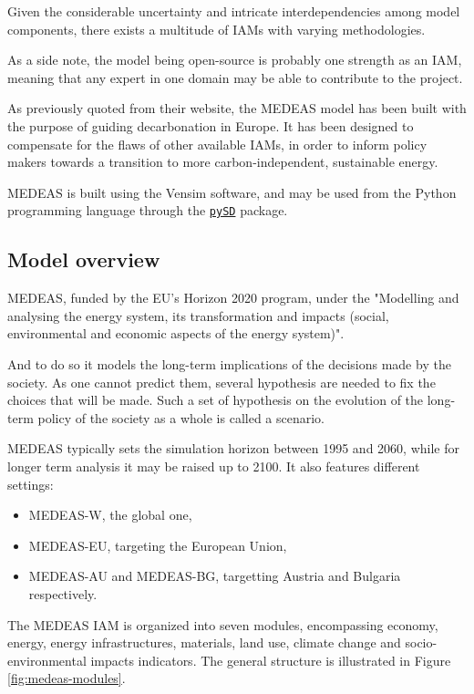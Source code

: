 Given the considerable uncertainty and intricate interdependencies among model components, there exists a multitude of IAMs with varying methodologies.

As a side note, the model being open-source is probably one strength as an IAM, meaning that any expert in one domain may be able to contribute to the project.

As previously quoted from their website, the MEDEAS model has been built with the purpose of guiding decarbonation in Europe. It has been designed to compensate for the flaws of other available IAMs, in order to inform policy makers towards a transition to more carbon-independent, sustainable energy.

MEDEAS is built using the Vensim software, and may be used from the Python programming language through the \href{https://pypi.org/project/pysd/}{\texttt{pySD}} package.

\subsection{Model overview}

MEDEAS, funded by the EU's Horizon 2020 program, under the "Modelling and analysing the energy system, its transformation and impacts (social, environmental and economic aspects of the energy system)".

And to do so it models the long-term implications of the decisions made by the society. As one cannot predict them, several hypothesis are needed to fix the choices that will be made. Such a set of hypothesis on the evolution of the long-term policy of the society as a whole is called a scenario.

MEDEAS typically sets the simulation horizon between 1995 and 2060, while for longer term analysis it may be raised up to 2100. It also features different settings:
\begin{itemize}
    \item MEDEAS-W, the global one,
    \item MEDEAS-EU, targeting the European Union,
    \item MEDEAS-AU and MEDEAS-BG, targetting Austria and Bulgaria respectively.
\end{itemize}

The MEDEAS IAM is organized into seven modules, encompassing economy, energy, energy infrastructures, materials, land use, climate change and socio-environmental impacts indicators. The general structure is illustrated in Figure \ref{fig:medeas-modules}.

